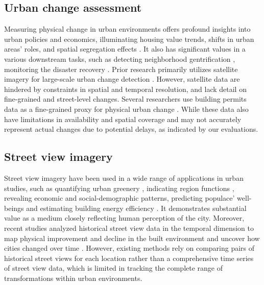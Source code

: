 \documentclass[letterpaper]{article} %
\begin{document}
\subsection{Urban change assessment}
Measuring physical change in urban environments offers profound insights into urban policies and economics, illuminating housing value trends, shifts in urban areas' roles, and spatial segregation effects \cite{Temkin1996NeighborhoodCA,Hwang2020UnequalDG}. It also has significant values in a various downstream tasks, such as detecting neighborhood gentrification \cite{hwang_gentrification}, monitoring the disaster recovery \cite{Stevenson2010UsingBP}. Prior research primarily utilizes satellite imagery for large-scale urban change detection \cite{Pandey2015UrbanizationAA,Daudt2018UrbanCD}. However, satellite data are hindered by constraints in spatial and temporal resolution, and lack detail on fine-grained and street-level changes. Several researchers use building permits data as a fine-grained proxy for physical urban change \cite{Stevenson2010UsingBP,Strauss2013DoesHD}. While these data also have limitations in availability and spatial coverage and may not accurately represent actual changes due to potential delays, as indicated by our evaluations.

\subsection{Street view imagery}
Street view imagery have been used in a wide range of applications in urban studies, such as quantifying urban greenery \cite{Li2015AssessingSU}, indicating region functions \cite{Gong2019ClassifyingSS}, revealing economic and social-demographic patterns\cite{gebru2017using,wang2020urban2vec,tian2021}, predicting populace' well-beings \cite{Lee2021PredictingLI} and estimating building energy efficiency \cite{MAYER2023120542}. 
It demonstrates substantial value as a medium closely reflecting human perception of the city. 
Moreover, recent studies analyzed historical street view data in the temporal dimension to map physical improvement and decline in the built environment and uncover how cities changed over time \cite{Naik2014StreetscoreP,Naik7571,Huang2022DetectingNG}. However, existing methods rely on comparing pairs of historical street views for each location rather than a comprehensive time series of street view data, which is limited in tracking the complete range of transformations within urban environments.
\end{document}
